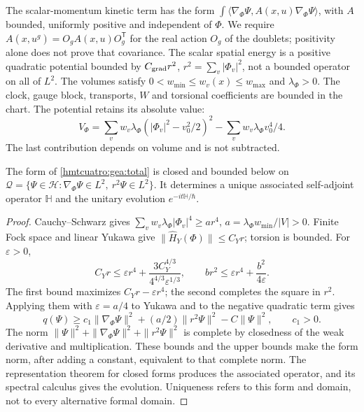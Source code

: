 The scalar-momentum kinetic term has the form $\int\langle\nabla_\Phi\Psi,A(x,u)\nabla_\Phi\Psi\rangle$, with $A$ bounded, uniformly positive and independent of $\Phi$. We require $A(x,u^g)=O_gA(x,u)O_g^{\mathsf T}$ for the real action $O_g$ of the doublets; positivity alone does not prove that covariance. The scalar spatial energy is a positive quadratic potential bounded by $C_{\rm grad}r^2$, $r^2=\sum_v|\Phi_v|^2$, not a bounded operator on all of $L^2$. The volumes satisfy $0<w_{\min}\leq w_v(x)\leq w_{\max}$ and $\lambda_\Phi>0$. The clock, gauge block, transports, $W$ and torsional coefficients are bounded in the chart. The potential retains its absolute value:
\begin{equation}
V_\Phi=\sum_vw_v\lambda_\Phi(|\Phi_v|^2-v_0^2/2)^2
-\sum_vw_v\lambda_\Phi v_0^4/4.
\label{hmtcuatro:gea:potencial}
\end{equation}
The last contribution depends on volume and is not subtracted.

\begin{theorem}
\label{hmtcuatro:gea:forma} The form of \eqref{hmtcuatro:gea:total} is closed and bounded below on $\mathcal Q=\{\Psi\in\mathscr H:\nabla_\Phi\Psi\in L^2,\
r^2\Psi\in L^2\}$. It determines a unique associated self-adjoint operator $\mathbb H$ and the unitary evolution $e^{-it\mathbb H/\hbar}$.
\end{theorem}
\begin{proof}
Cauchy--Schwarz gives $\sum_vw_v\lambda_\Phi|\Phi_v|^4\geq ar^4$, $a=\lambda_\Phi w_{\min}/|V|>0$. Finite Fock space and linear Yukawa give $\|\widehat H_Y(\Phi)\|\leq C_Yr$; torsion is bounded. For $\varepsilon>0$,
\[
C_Yr\leq\varepsilon r^4+
\frac{3C_Y^{4/3}}{4^{4/3}\varepsilon^{1/3}},\qquad
br^2\leq\varepsilon r^4+\frac{b^2}{4\varepsilon}.
\]
The first bound maximizes $C_Yr-\varepsilon r^4$; the second completes the square in $r^2$. Applying them with $\varepsilon=a/4$ to Yukawa and to the negative quadratic term gives
\[
q(\Psi)\geq c_1\|\nabla_\Phi\Psi\|^2+
(a/2)\|r^2\Psi\|^2-C\|\Psi\|^2,\qquad c_1>0.
\]
The norm $\|\Psi\|^2+\|\nabla_\Phi\Psi\|^2+\|r^2\Psi\|^2$ is complete by closedness of the weak derivative and multiplication. These bounds and the upper bounds make the form norm, after adding a constant, equivalent to that complete norm. The representation theorem for closed forms produces the associated operator, and its spectral calculus gives the evolution. Uniqueness refers to this form and domain, not to every alternative formal domain.
\end{proof}

